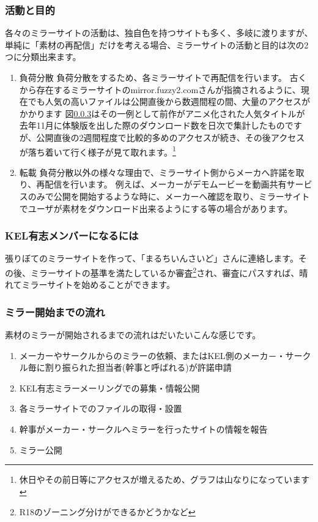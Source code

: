 \subsubsection{活動と目的}
各々のミラーサイトの活動は、独自色を持つサイトも多く、多岐に渡りますが、単純に「素材の再配信」だけを考える場合、ミラーサイトの活動と目的は次の2つに分類出来ます。\cite{fuzzy2_2}
\begin{enumerate}
 \item 負荷分散
  負荷分散をするため、各ミラーサイトで再配信を行います。
  古くから存在するミラーサイトのmirror.fuzzy2.comさんが指摘されるように、現在でも人気の高いファイルは公開直後から数週間程の間、大量のアクセスがかかります\cite{fuzzy2_1}
  図\ref{}はその一例として前作がアニメ化された人気タイトルが去年11月に体験版を出した際のダウンロード数を日次で集計したものですが、公開直後の2週間程度で比較的多めのアクセスが続き、その後アクセスが落ち着いて行く様子が見て取れます。\footnote{休日やその前日等にアクセスが増えるため、グラフは山なりになっています}

 \item 転載
  負荷分散以外の様々な理由で、ミラーサイト側からメーカへ許諾を取り、再配信を行います。
  例えば、メーカーがデモムービーを動画共有サービスのみで公開を開始するような時に、メーカーへ確認を取り、ミラーサイトでユーザが素材をダウンロード出来るようにする等の場合があります。
\end{enumerate}

\subsubsection{KEL有志メンバーになるには}

張りぼてのミラーサイトを作って、「まるちいんさいど」さんに連絡します。その後、ミラーサイトの基準を満たしているか審査\footnote{R18のゾーニング分けができるかどうかなど}され、審査にパスすれば、晴れてミラーサイトを始めることができます。


\subsubsection{ミラー開始までの流れ}

素材のミラーが開始されるまでの流れはだいたいこんな感じです。
\begin{enumerate}
 \item メーカーやサークルからのミラーの依頼、またはKEL側のメーカ－・サークル毎に割り振られた担当者(幹事と呼ばれる)が許諾申請
 \item KEL有志ミラーメーリングでの募集・情報公開
 \item 各ミラーサイトでのファイルの取得・設置
 \item 幹事がメーカー・サークルへミラーを行ったサイトの情報を報告
 \item ミラー公開
\end{enumerate}
\cite{XES}

